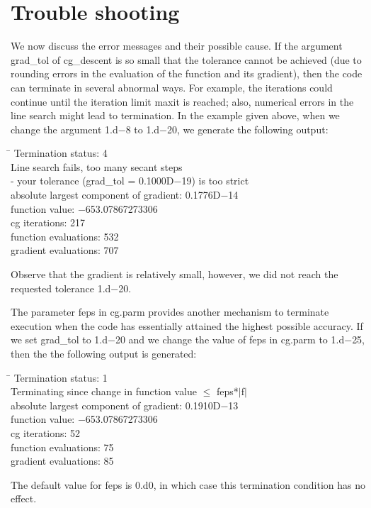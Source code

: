 \documentclass [12pt] {article}
\begin{document}
\section{Trouble shooting}
\label{trouble}
We now discuss the error messages and their possible cause.
If the argument {\sc grad\_tol} of {\sc cg\_descent} is so small that the
tolerance cannot be achieved (due to rounding errors in the evaluation
of the function and its gradient), then the code can terminate in several
abnormal ways.
For example,
the iterations could continue until the iteration
limit {\sc maxit} is reached;
also, numerical errors in the line search might lead to termination.
In the example given above, when we change the argument 1.d$-$8 to 1.d$-$20,
we generate the following output:
\begin{tabbing}
\hspace{2em} \= \kill
\> \sc Termination status:  4 \\
\> \sc Line search fails, too many secant steps \\
\> \sc   - your tolerance (grad\_tol = 0.1000D$-$19) is too strict \\
\> \sc absolute largest component of gradient: 0.1776D$-$14 \\
\> \sc function value:   $-$653.07867273306 \\
\> \sc cg iterations:  217 \\
\> \sc function evaluations:  532 \\
\> \sc gradient evaluations:  707
\end{tabbing}
Observe that the gradient is relatively small, however, we did not
reach the requested tolerance 1.d$-$20.

The parameter {\sc feps} in {\sc cg.parm}
provides another mechanism to terminate
execution when the code has essentially attained the highest
possible accuracy.
If we set {\sc grad\_tol}
to 1.d$-$20 and we change the value of {\sc feps} in
{\sc cg.parm} to 1.d$-$25, then the the following output is generated:
\begin{tabbing}
\hspace{2em} \= \kill
\> \sc Termination status:  1 \\
\> \sc Terminating since change in function value $\le$ feps*$|$f$|$ \\
\> \sc absolute largest component of gradient: 0.1910D$-$13 \\
\> \sc function value:   $-$653.07867273306 \\
\> \sc cg iterations:  52 \\
\> \sc function evaluations:  75 \\
\> \sc gradient evaluations:  85
\end{tabbing}
The default value for {\sc feps} is 0.d0, in which case this termination
condition has no effect.
\end{document}
